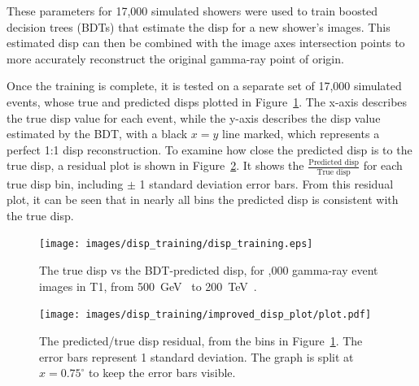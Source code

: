 These parameters for 17,000 simulated showers were used to train boosted decision trees (BDTs) that estimate the disp for a new shower's images.
This estimated disp can then be combined with the image axes intersection points to more accurately reconstruct the original gamma-ray point of origin.

Once the training is complete, it is tested on a separate set of 17,000 simulated events, whose true and predicted disps plotted in Figure~\ref{fig:disptraining}.
The x-axis describes the true disp value for each event, while the y-axis describes the disp value estimated by the BDT, with a black $x=y$ line marked, which represents a perfect 1:1 disp reconstruction.
To examine how close the predicted disp is to the true disp, a residual plot is shown in Figure~\ref{fig:dispresidual}.
It shows the $\frac{\textrm{Predicted disp}}{\textrm{True disp}}$ for each true disp bin, including $\pm$ 1 standard deviation error bars.
From this residual plot, it can be seen that in nearly all bins the predicted disp is consistent with the true disp.

\begin{figure}[b]
  \centering
  \texttt{[image: images/disp\_training/disp\_training.eps]}
  \caption[Disp BDT Training]{
    The true disp vs the BDT-predicted disp, for ,000 gamma-ray event images in T1, from \SI{500}{\GeV{}} to \SI{200}{\TeV{}}.
  }
  \label{fig:disptraining}
\end{figure}

\begin{figure}[t]
  \centering
  \texttt{[image: images/disp\_training/improved\_disp\_plot/plot.pdf]}
  \caption[Disp BDT Residual]{
    The predicted/true disp residual, from the bins in Figure~\ref{fig:disptraining}.
    The error bars represent 1 standard deviation.
    The graph is split at $x=0.75^{\circ}$ to keep the error bars visible.
  }
  \label{fig:dispresidual}
\end{figure}

